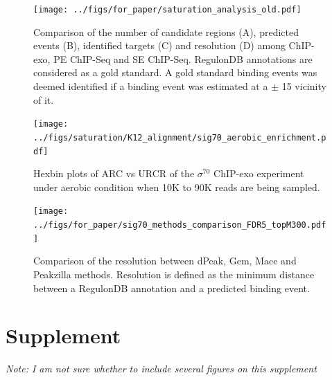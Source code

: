 \documentclass{bmcart}\usepackage[]{graphicx}\usepackage[]{color}
\newcommand{\beginsupplement}{%
        \setcounter{table}{0}
        \renewcommand{\thetable}{S\arabic{table}}%
        \setcounter{figure}{0}
        \renewcommand{\thefigure}{S\arabic{figure}}%
     }
\newcommand{\sig}{\sigma^{70}}
\begin{document}
\newpage

\begin{figure}[h]
  \centering
  \texttt{[image: ../figs/for\_paper/saturation\_analysis\_old.pdf]}
  \caption{Comparison of the number of candidate regions (A),
    predicted events (B), identified targets (C) and resolution (D)
    among ChIP-exo, PE ChIP-Seq and SE ChIP-Seq. RegulonDB annotations
    are considered as a gold standard. A gold standard binding events
    was deemed identified if a binding event was estimated at a $\pm$
    15 vicinity of it.}
  \label{fig:design}
\end{figure}


 \newpage

\begin{figure}[h!]
  \centering
\texttt{[image: ../figs/saturation/K12\_alignment/sig70\_aerobic\_enrichment.pdf]}
\caption{Hexbin plots of ARC vs URCR of the $\sig$ ChIP-exo experiment
  under aerobic condition when 10K to 90K reads are being sampled.}
  \label{fig:exoQC_sat_aero}
\end{figure}

\newpage

\begin{figure}[h!]
  \centering
  \texttt{[image: ../figs/for\_paper/sig70\_methods\_comparison\_FDR5\_topM300.pdf]}
  \caption{Comparison of the resolution between dPeak, Gem, Mace and
    Peakzilla methods. Resolution is defined as the minimum distance
    between a RegulonDB annotation and a predicted binding event.}
  \label{fig:methods_comp}
\end{figure}

\newpage

\beginsupplement

\section*{Supplement}
\label{sec:supp}


\emph{Note: I am not sure whether to include several figures on this supplement}
\end{document}
